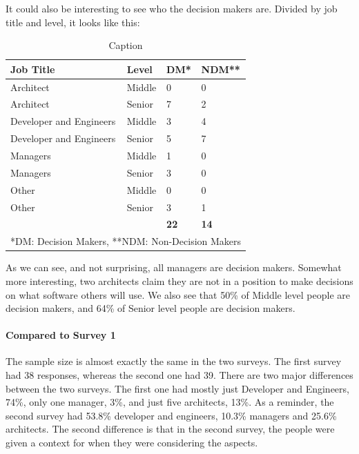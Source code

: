 \documentclass{article}
\begin{document}
It could also be interesting to see who the decision makers are. Divided
by job title and level, it looks like this:

\begin{table}[H]
\centering
\begin{tabular}{l l l l}
\textbf{Job Title} & \textbf{Level} & \textbf{DM*} & \textbf{NDM**} \\ \hline
Architect               & Middle & 0               & 0                   \\
Architect               & Senior & 7               & 2                   \\ \hline
Developer and Engineers & Middle & 3               & 4                   \\
Developer and Engineers & Senior & 5               & 7                   \\ \hline
Managers                & Middle & 1               & 0                   \\
Managers                & Senior & 3               & 0                   \\ \hline
Other                   & Middle & 0               & 0                   \\
Other                   & Senior & 3               & 1                   \\ \hdashline
&        &     \textbf{22}          & \textbf{14}              \\ \hline\hline
\multicolumn{4}{l}{*DM: Decision Makers, **NDM: Non-Decision Makers}

\end{tabular}
\caption{Caption}
\label{tab:my_label}
\end{table}

As we can see, and not surprising, all managers are decision makers.
Somewhat more interesting, two architects claim they are not in a
position to make decisions on what software others will use. We also see
that 50\% of Middle level people are decision makers, and 64\% of Senior
level people are decision makers.


\paragraph{Compared to Survey 1}

The sample size is almost exactly the same in the two surveys. The first
survey had 38 responses, whereas the second one had 39. There are two
major differences between the two surveys. The first one had mostly just
Developer and Engineers, 74\%, only one manager, 3\%, and just five
architects, 13\%. As a reminder, the second survey had 53.8\% developer
and engineers, 10.3\% managers and 25.6\% architects. The second
difference is that in the second survey, the people were given a context
for when they were considering the aspects.
\end{document}
